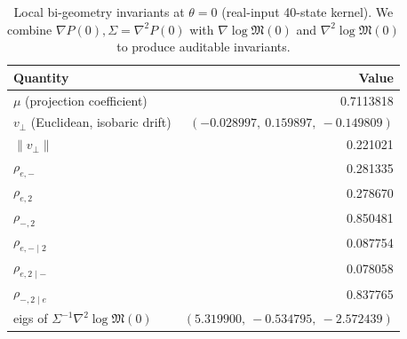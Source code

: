 \begin{table}[H]
\centering
\scriptsize
\setlength{\tabcolsep}{8pt}
\renewcommand{\arraystretch}{1.2}
\caption{Local bi-geometry invariants at $\theta=0$ (real-input 40-state kernel). We combine $\nabla P(0),\Sigma=\nabla^2P(0)$ with $\nabla\log\mathfrak{M}(0)$ and $\nabla^2\log\mathfrak{M}(0)$ to produce auditable invariants.}
\label{tab:real-input-40-local-bigeometry-invariants}
\begin{tabular}{@{}l r@{}}
\toprule
Quantity & Value\\
\midrule
$\mu$ (projection coefficient) & 0.7113818\\
$v_\perp$ (Euclidean, isobaric drift) & $(-0.028997,\ 0.159897,\ -0.149809)$\\
$\|v_\perp\|$ & 0.221021\\
\midrule
$\rho_{e,-}$ & 0.281335\\
$\rho_{e,2}$ & 0.278670\\
$\rho_{-,2}$ & 0.850481\\
\midrule
$\rho_{e,-\mid 2}$ & 0.087754\\
$\rho_{e,2\mid -}$ & 0.078058\\
$\rho_{-,2\mid e}$ & 0.837765\\
\midrule
eigs of $\Sigma^{-1}\nabla^2\log\mathfrak{M}(0)$ & $(5.319900,\ -0.534795,\ -2.572439)$\\
\bottomrule
\end{tabular}
\end{table}

